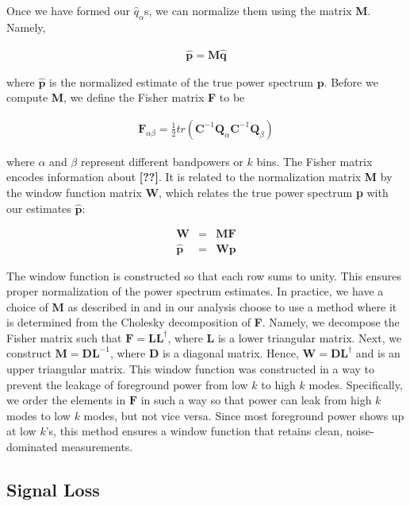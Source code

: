 \documentclass[preprint2,numberedappendix,tighten,twocolappendix]{aastex6}  %
\newcommand{\cc}[1]{{\color{purple} \textbf{[#1]}}}
\begin{document}
Once we have formed our $\hat{q}_{\alpha}$s, we can normalize them using the matrix \textbf{M}. Namely,

\begin{eqnarray}
\hat{\textbf{p}} = \textbf{M}\hat{\textbf{q}}
\end{eqnarray}

\noindent where $\hat{\textbf{p}}$ is the normalized estimate of the true power spectrum $\textbf{p}$. Before we compute \textbf{M}, we define the Fisher matrix \textbf{F} to be

\begin{eqnarray}
\textbf{F}_{\alpha\beta} = \frac{1}{2}tr(\textbf{C}^{-1}\textbf{Q}_{\alpha}\textbf{C}^{-1}\textbf{Q}_{\beta})
\end{eqnarray}

\noindent where $\alpha$ and $\beta$ represent different bandpowers or $k$ bins. The Fisher matrix encodes information about \cc{??}. It is related to the normalization matrix \textbf{M} by the window function matrix \textbf{W}, which relates the true power spectrum \textbf{p} with our estimates $\hat{\textbf{p}}$:

\begin{eqnarray}
\textbf{W} &=& \textbf{MF} \\
\hat{\textbf{p}} &=& \textbf{Wp}
\end{eqnarray}

\noindent The window function is constructed so that each row sums to unity. This ensures proper normalization of the power spectrum estimates. In practice, we have a choice of \textbf{M} as described in \citet{liu_et_al2014b} and in our analysis choose to use a method where it is determined from the Cholesky decomposition of \textbf{F}. Namely, we decompose the Fisher matrix such that $\textbf{F} = \textbf{L}\textbf{L}^{\dagger}$, where $\textbf{L}$ is a lower triangular matrix. Next, we construct $\textbf{M} = \textbf{D}\textbf{L}^{-1}$, where \textbf{D} is a diagonal matrix. Hence, $\textbf{W} = \textbf{D}\textbf{L}^{\dagger}$ and is an upper triangular matrix. This window function was constructed in a way to prevent the leakage of foreground power from low $k$ to high $k$ modes. Specifically, we order the elements in $\textbf{F}$ in such a way so that power can leak from high $k$ modes to low $k$ modes, but not vice versa. Since most foreground power shows up at low $k$'s, this method ensures a window function that retains clean, noise-dominated measurements.

\subsection{Signal Loss}
\label{sec:Sigloss}
\end{document}
